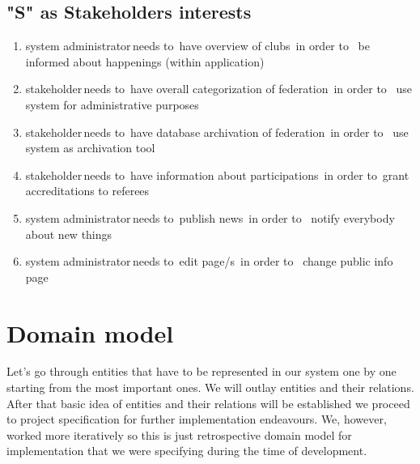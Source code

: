 \subsection*{"S" as Stakeholders interests}
\begin{enumerate}
  \item \lbrack system administrator\rbrack \,needs to\, \lbrack have overview of clubs\rbrack \, in order to \, \lbrack be informed about happenings (within application)\rbrack
  \item \lbrack stakeholder\rbrack \,needs to\, \lbrack have overall categorization of federation\rbrack \, in order to \, \lbrack use system for administrative purposes\rbrack
  \item \lbrack stakeholder\rbrack \,needs to\, \lbrack have database archivation of federation\rbrack \, in order to \, \lbrack use system as archivation tool\rbrack
  \item \lbrack stakeholder\rbrack \,needs to\, \lbrack have information about participations\rbrack \, in order to\, \lbrack grant accreditations to referees\rbrack
  \item \lbrack system administrator\rbrack \,needs to\, \lbrack publish news\rbrack \, in order to \, \lbrack notify everybody about new things\rbrack
  \item \lbrack system administrator\rbrack \,needs to\, \lbrack edit page/s\rbrack \, in order to \, \lbrack change public info page\rbrack
\end{enumerate}
\section{Domain model}
Let's go through entities that have to be represented in our system one by one starting from the most important ones. We will outlay entities and their relations. After that basic idea of entities and their relations will be established we proceed to project specification for further implementation endeavours. We, however, worked more iteratively so this is just retrospective domain model for implementation that we were specifying during the time of development. 
\par
